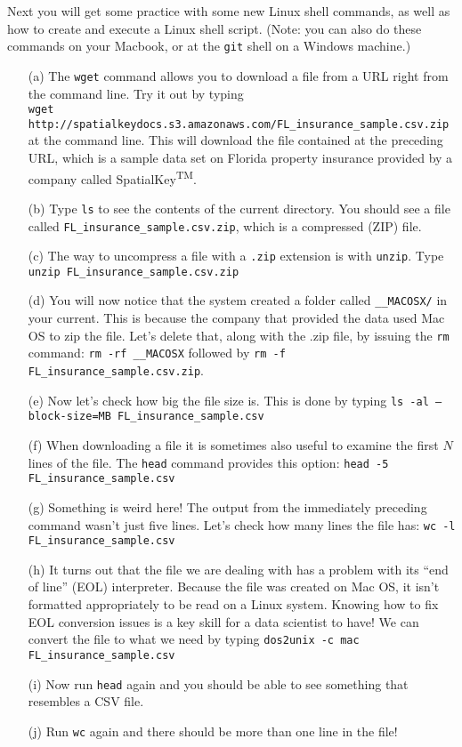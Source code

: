 \documentclass[12pt,english]{exam}
\begin{document}
\begin{questions}
\question Next you will get some practice with some new Linux shell commands, as well as how to create and execute a Linux shell script. (Note: you can also do these commands on your Macbook, or at the \texttt{git} shell on a Windows machine.)
\begin{itemize}
	\item[(a)] The \texttt{wget} command allows you to download a file from a URL right from the command line. Try it out by typing\\ \texttt{wget http://spatialkeydocs.s3.amazonaws.com/FL\_insurance\_sample.csv.zip} at the command line. This will download the file contained at the preceding URL, which is a sample data set on Florida property insurance provided by a company called SpatialKey\textsuperscript{TM}.
	\item[(b)] Type \texttt{ls} to see the contents of the current directory. You should see a file called \texttt{FL\_insurance\_sample.csv.zip}, which is a compressed (ZIP) file.
	\item[(c)] The way to uncompress a file with a \texttt{.zip} extension is with \texttt{unzip}. Type \texttt{unzip FL\_insurance\_sample.csv.zip}
	\item[(d)] You will now notice that the system created a folder called \texttt{\_\_MACOSX/} in your current. This is because the company that provided the data used Mac OS to zip the file. Let's delete that, along with the .zip file, by issuing the \texttt{rm} command: \texttt{rm -rf \_\_MACOSX} followed by \texttt{rm -f FL\_insurance\_sample.csv.zip}. 
	\item[(e)] Now let's check how big the file size is. This is done by typing \texttt{ls -al --block-size=MB FL\_insurance\_sample.csv}
	\item[(f)] When downloading a file it is sometimes also useful to examine the first $N$ lines of the file. The \texttt{head} command provides this option: \texttt{head -5 FL\_insurance\_sample.csv}
	\item[(g)] Something is weird here! The output from the immediately preceding command wasn't just five lines. Let's check how many lines the file has: \texttt{wc -l FL\_insurance\_sample.csv}
	\item[(h)] It turns out that the file we are dealing with has a problem with its ``end of line'' (EOL) interpreter. Because the file was created on Mac OS, it isn't formatted appropriately to be read on a Linux system. Knowing how to fix EOL conversion issues is a key skill for a data scientist to have! We can convert the file to what we need by typing \texttt{dos2unix -c mac FL\_insurance\_sample.csv}
	\item[(i)] Now run \texttt{head} again and you should be able to see something that resembles a CSV file.
	\item[(j)] Run \texttt{wc} again and there should be more than one line in the file!
\end{itemize}


\end{questions}
\end{document}
